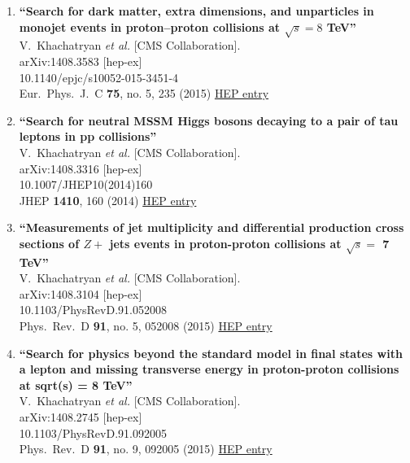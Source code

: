\documentclass{article}
\begin{document}
\begin{enumerate}
\item%
{\bf ``Search for dark matter, extra dimensions, and unparticles in monojet events in proton–proton collisions at $\sqrt{s} = 8$ TeV''}
  \\{}V.~Khachatryan {\it et al.} [CMS Collaboration].
  \\{}arXiv:1408.3583 [hep-ex]
    \\{}10.1140/epjc/s10052-015-3451-4
\\{}Eur.\ Phys.\ J.\ C {\bf 75}, no. 5, 235 (2015) %
\href{http://inspirehep.net/record/1311223}{HEP entry}


\item%
{\bf ``Search for neutral MSSM Higgs bosons decaying to a pair of tau leptons in pp collisions''}
  \\{}V.~Khachatryan {\it et al.} [CMS Collaboration].
  \\{}arXiv:1408.3316 [hep-ex]
    \\{}10.1007/JHEP10(2014)160
\\{}JHEP {\bf 1410}, 160 (2014) %
\href{http://inspirehep.net/record/1310838}{HEP entry}


\item%
{\bf ``Measurements of jet multiplicity and differential production cross sections of $Z +$ jets events in proton-proton collisions at $\sqrt{s} =$ 7 TeV''}
  \\{}V.~Khachatryan {\it et al.} [CMS Collaboration].
  \\{}arXiv:1408.3104 [hep-ex]
    \\{}10.1103/PhysRevD.91.052008
\\{}Phys.\ Rev.\ D {\bf 91}, no. 5, 052008 (2015) %
\href{http://inspirehep.net/record/1310737}{HEP entry}


\item%
{\bf ``Search for physics beyond the standard model in final states with a lepton and missing transverse energy in proton-proton collisions at sqrt(s) = 8 TeV''}
  \\{}V.~Khachatryan {\it et al.} [CMS Collaboration].
  \\{}arXiv:1408.2745 [hep-ex]
    \\{}10.1103/PhysRevD.91.092005
\\{}Phys.\ Rev.\ D {\bf 91}, no. 9, 092005 (2015) %
\href{http://inspirehep.net/record/1310653}{HEP entry}



\end{enumerate}
\end{document}
